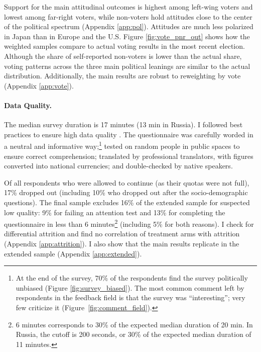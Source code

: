 \documentclass[12pt,english]{article}
\begin{document}
Support for the main attitudinal outcomes 
is highest among left-wing voters and lowest among far-right voters, while non-voters hold attitudes close to the center of the political spectrum (Appendix \ref{app:pol}). Attitudes are much less polarized in Japan than in Europe and the U.S. 
Figure \ref{fig:vote_pnr_out} shows 
how the weighted samples compare to actual voting results in the most recent election. 
Although the share of self-reported non-voters is lower than the actual share, voting patterns across the three main political leanings are similar to the actual distribution. 
Additionally, the main results are robust to reweighting by vote (Appendix \ref{app:vote}). 

\paragraph{Data Quality.}\label{par:data_quality}
The median survey duration is 17 minutes (13 min in Russia). 
I followed best practices to ensure high data quality \citep{stantcheva_how_2023}. 
The questionnaire was carefully worded in a neutral and informative way;\footnote{At the end of the survey, 70\% of the respondents find the survey politically unbiased (Figure \ref{fig:survey_biased}). The most common comment left by respondents in the feedback field is that the survey was ``interesting''; very few criticize it (Figure~\ref{fig:comment_field}).} tested on random people in public spaces to ensure correct comprehension; translated by professional translators, with figures converted into national currencies; and double-checked by native speakers.

Of all respondents who %
were allowed to continue (as their quotas were not full), %
17\% dropped out (including 10\% who dropped out after the socio-demographic questions). The final sample excludes 16\% of the extended sample for suspected low quality: 9\% for failing an attention test and 13\% for completing the questionnaire in less than 6 minutes\footnote{6 minutes corresponds to 30\% of the expected median duration of 20 min. In Russia, the cutoff is 200 seconds, or 30\% of the expected median duration of 11 minutes.} (including 5\% for both reasons). 
I check for differential attrition and find no correlation of treatment arms with attrition (Appendix \ref{app:attrition}). I also show that the main results replicate in the extended sample (Appendix \ref{app:extended}). 
\end{document}

